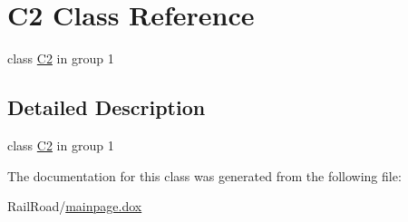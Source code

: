 \hypertarget{class_c2}{\section{C2 Class Reference}
\label{class_c2}
}


class \hyperlink{class_c2}{C2} in group 1  




\subsection{Detailed Description}
class \hyperlink{class_c2}{C2} in group 1 

The documentation for this class was generated from the following file\-:\begin{DoxyCompactItemize}
\item 
Rail\-Road/\hyperlink{mainpage_8dox}{mainpage.\-dox}\end{DoxyCompactItemize}
